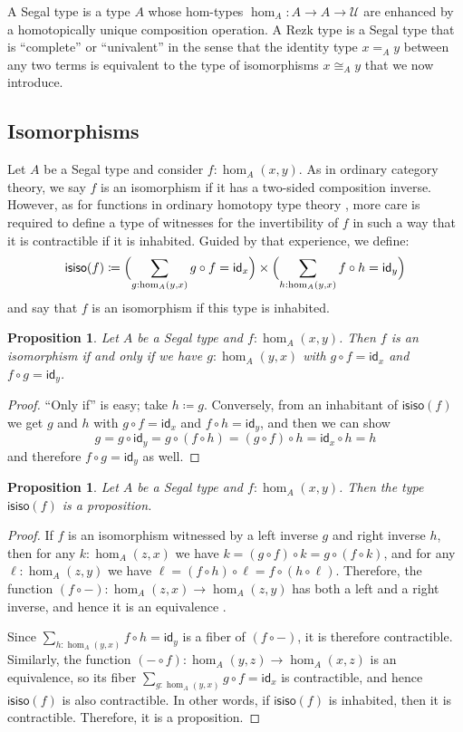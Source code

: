 \documentclass[12pt]{amsart}
\theoremstyle{plain}
\newtheorem{prop}[thm]{Proposition}
\theoremstyle{definition}
\theoremstyle{remark}
\numberwithin{equation}{section}
\newcommand{\defeq}{\coloneqq}
\newcommand{\univtype}{\mathcal{U}}
\newcommand{\idarr}[1]{\mathsf{id}_{#1}}
\newcommand{\isiso}[1]{\mathsf{isiso}(#1)}
\newcommand{\Parens}[1]{\Bigl(#1\Bigr)}
\begin{document}
A Segal type is a type $A$ whose hom-types $\hom_A : A \to A \to \univtype$ are enhanced by a homotopically unique composition operation. A Rezk type is a Segal type that is ``complete'' or ``univalent'' in the sense that the identity type $x  =_A y$ between any two terms is equivalent to the type of isomorphisms $x \cong_A y$ that we now introduce.

\subsection{Isomorphisms}
\label{sec:isos}

Let $A$ be a Segal type and consider $f : \hom_A(x,y)$. As in ordinary category theory, we say $f$ is an isomorphism if it has a two-sided composition inverse. However, as for functions in ordinary homotopy type theory \cite[Chapter 4]{hottbook}, more care is required to define a type of witnesses for the invertibility of $f$ in such a way that it is contractible if it is inhabited. Guided by that experience, we define:
\[\isiso f \defeq \Parens{\sum_{g:\hom_A(y,x)} g\circ f = \idarr x}
\times \Parens{\sum_{h:\hom_A(y,x)} f\circ h = \idarr y} \]
and say that $f$ is an isomorphism if this type is inhabited.

\begin{prop}
  Let $A$ be a Segal type and $f:\hom_A(x,y)$.
  Then $f$ is an isomorphism if and only if we have $g:\hom_A(y,x)$ with $g\circ f = \idarr x$ and $f\circ g = \idarr y$.
\end{prop}
\begin{proof}
  ``Only if'' is easy; take $h\defeq g$.
  Conversely, from an inhabitant of $\isiso f$ we get $g$ and $h$ with $g\circ f = \idarr x$ and $f\circ h = \idarr y$, and then we can show
  \[ g = g \circ \idarr y = g \circ (f\circ h) = (g\circ f) \circ h = \idarr x \circ h = h \]
  and therefore $f\circ g = \idarr y$ as well.
\end{proof}

\begin{prop} Let $A$ be a Segal type and $f : \hom_A(x,y)$. Then the type $\isiso f$ is a proposition.
\end{prop}
\begin{proof}
If $f$ is an isomorphism witnessed by a left inverse $g$ and right inverse $h$, then for any $k:\hom_A(z,x)$ we have $k = (g\circ f)\circ k = g\circ (f\circ k)$, and for any $\ell:\hom_A(z,y)$ we have $\ell = (f\circ h)\circ \ell = f\circ (h\circ \ell)$.
Therefore, the function $(f\circ -) : \hom_A(z,x) \to \hom_A(z,y)$ has both a left and a right inverse, and hence it is an equivalence \cite[4.3.3]{hottbook}.

Since $\sum_{h:\hom_A(y,x)} f\circ h = \idarr y$ is a fiber of $(f\circ -)$, it is therefore contractible.
Similarly, the function $(-\circ f) : \hom_A(y,z) \to \hom_A(x,z)$ is an equivalence, so its fiber $\sum_{g:\hom_A(y,x)} g\circ f = \idarr x$ is contractible, and hence $\isiso f$ is also contractible. In other words, if $\isiso f$ is inhabited, then it is contractible.
Therefore, it is a proposition.
\end{proof}
\end{document}
